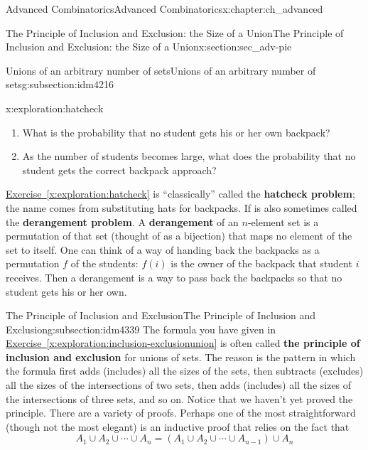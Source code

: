 \documentclass[oneside,10pt,]{book}
\newcommand{\terminology}[1]{\textbf{#1}}
\numberwithin{equation}{chapter}
\begin{document}
\begin{chapterptx}{Advanced Combinatorics}{}{Advanced Combinatorics}{}{}{x:chapter:ch_advanced}
\begin{sectionptx}{The Principle of Inclusion and Exclusion: the Size of a Union}{}{The Principle of Inclusion and Exclusion: the Size of a Union}{}{}{x:section:sec_adv-pie}
\begin{subsectionptx}{Unions of an arbitrary number of sets}{}{Unions of an arbitrary number of sets}{}{}{g:subsection:idm4216}
\begin{exploration}{}{x:exploration:hatcheck}
\begin{enumerate}[font=\bfseries,label=(\alph*),ref=\alph*]
\item\label{x:task:hatcheckprobpart}What is the probability that no student gets his or her own backpack?%
\item{}As the number of students becomes large, what does the probability that no student gets the correct backpack approach?%
\end{enumerate}
\end{exploration}
\hyperref[x:exploration:hatcheck]{Exercise~\ref{x:exploration:hatcheck}} is ``classically'' called the \terminology{hatcheck problem}; the name comes from substituting hats for backpacks. If is also sometimes called the \terminology{derangement problem}. A \terminology{derangement} of an \(n\)-element set is a permutation of that set (thought of as a bijection) that maps no element of the set to itself. One can think of a way of handing back the backpacks as a permutation \(f\) of the students: \(f(i)\) is the owner of the backpack that student \(i\) receives. Then a derangement is a way to pass back the backpacks so that no student gets his or her own.%
\end{subsectionptx}
%
%
\typeout{************************************************}
\typeout{************************************************}
%
\begin{subsectionptx}{The Principle of Inclusion and Exclusion}{}{The Principle of Inclusion and Exclusion}{}{}{g:subsection:idm4339}
The formula you have given in \hyperref[x:exploration:inclusion-exclusionunion]{Exercise~\ref{x:exploration:inclusion-exclusionunion}} is often called \terminology{the principle of inclusion and exclusion} for unions of sets. The reason is the pattern in which the formula first adds (includes) all the sizes of the sets, then subtracts (excludes) all the sizes of the intersections of two sets, then adds (includes) all the sizes of the intersections of three sets, and so on.   Notice that we haven't yet proved the principle. There are a variety of proofs.  Perhaps one of the most straightforward (though not the most elegant) is an inductive proof that relies on the fact that%
\begin{equation*}
A_1 \cup A_2 \cup \cdots \cup A_n = \left(A_1 \cup A_2 \cup \cdots \cup A_{n-1}\right) \cup A_n
\end{equation*}

\end{subsectionptx}
\end{sectionptx}
\end{chapterptx}
\end{document}
